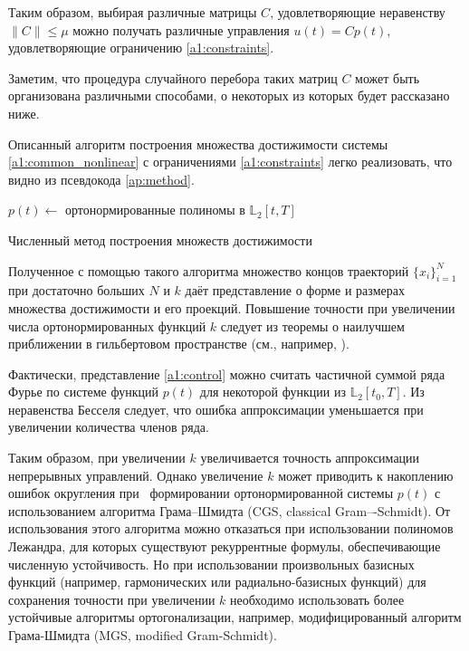 \documentclass[../main.tex]{subfiles}
\begin{document}
 Таким образом, выбирая различные матрицы $C$, удовлетворяющие неравенству $\| C\| \leqslant \mu $ можно получать различные управления $u(t) = C p(t)$, удовлетворяющие ограничению \eqref{a1:constraints}.
 
 Заметим, что процедура случайного перебора таких матриц $C$ может быть организована различными способами, о некоторых из которых будет рассказано ниже.
 
 Описанный алгоритм построения множества достижимости системы \eqref{a1:common_nonlinear} с ограничениями \eqref{a1:constraints} легко реализовать, что видно из псевдокода \ref{ap:method}.
 \begin{algorithm}[hbt!]
 	$p(t) \gets $ ортонормированные полиномы в $\mathbb{L}_2[t,T]$\;
 	\caption{Численный метод построения множеств достижимости}
 	 \label{ap:method}
 \end{algorithm}
 
 Полученное с помощью такого алгоритма множество концов траекторий $\{x_i\}_{i = 1}^{N}$ при достаточно больших $N$ и $k$ даёт представление о форме и размерах множества достижимости и его проекций. 
 Повышение точности при увеличении числа ортонормированных функций $k$ следует из теоремы о наилучшем приближении в гильбертовом пространстве (см., например, \cite{Kolmogorov}). 
 
 Фактически, представление \eqref{a1:control} можно считать частичной суммой ряда Фурье по системе функций $p(t)$ для некоторой функции из $\mathbb{L}_2[t_0, {T}]$. 
 Из неравенства Бесселя следует, что ошибка аппроксимации уменьшается при увеличении количества членов ряда. 
 
 Таким образом, при увеличении $k$ увеличивается точность аппроксимации непрерывных управлений. 
 Однако увеличение $k$ может приводить к накоплению ошибок округления при  формировании ортонормированной системы $p(t)$ с использованием алгоритма Грама--Шмидта (CGS, classical Gram–-Schmidt). 
 От использования этого алгоритма можно отказаться при использовании полиномов Лежандра, для которых существуют рекуррентные формулы, обеспечивающие численную устойчивость. 
 Но при использовании произвольных базисных функций (например, гармонических или радиально-базисных функций) для сохранения точности при увеличении $k$ необходимо использовать более устойчивые алгоритмы ортогонализации, например, модифицированный алгоритм Грама-Шмидта (MGS, modified Gram-Schmidt).
 
\end{document}
